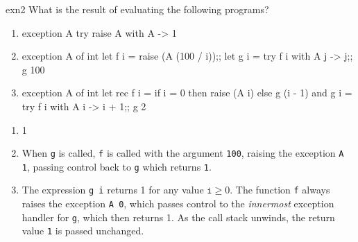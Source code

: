 %
\begin{exercise}{exn2}
What is the result of evaluating the following programs?

\begin{enumerate}
\item

\begin{ocamllisting}
exception A
try raise A with
   A -> 1
\end{ocamllisting}

\item

\begin{ocamllisting}
exception A of int
let f i =
   raise (A (100 / i));;
let g i =
   try f i with
      A j -> j;;
g 100
\end{ocamllisting}

\item

\begin{ocamllisting}
exception A of int
let rec f i =
   if i = 0 then
      raise (A i)
   else
      g (i - 1)
and g i =
   try f i with
      A i -> i + 1;;
g 2
\end{ocamllisting}
\end{enumerate}

\begin{answer}\ifanswers
\begin{enumerate}
\item 1

\item

When \lstinline+g+ is called, \lstinline+f+ is called with the argument \lstinline+100+, raising the
exception \lstinline+A 1+, passing control back to \lstinline+g+ which returns \lstinline+1+.

\item

The expression \lstinline+g i+ returns 1 for any value $\texttt{i} \ge 0$.  The function \lstinline+f+ always
raises the exception \lstinline+A 0+, which passes control to the \emph{innermost} exception handler for
\lstinline+g+, which then returns 1.  As the call stack unwinds, the return value \lstinline+1+ is passed unchanged.

\end{enumerate}
\fi\end{answer}
\end{exercise}


